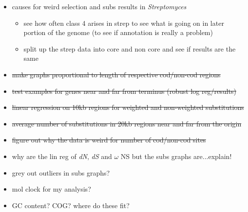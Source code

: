 \documentclass[12pt]{article}
\newcommand{\strep}{\textit{Streptomyces}\xspace}
\newcommand{\dn}{\textit{dN}\xspace}
\newcommand{\ds}{\textit{dS}\xspace}
\begin{document}
\begin{itemize}
	\item causes for weird selection and subs results in \strep
	\begin{itemize}
		\item see how often class 4 arises in strep to see what is going on in later portion of the genome (to see if annotation is really a problem)
		
		\item split up the strep data into core and non core and see if results are the same
	\end{itemize}
	
	\item \sout{make graphs proportional to length of respective cod/non-cod regions}
	
	\item \sout{test examples for genes near and far from terminus (robust log reg/results)}
	
	\item \sout{linear regression on 10kb regions for weighted and non-weighted substitutions}
	
	\item \sout{average number of substitutions in 20kb regions near and far from the origin}
	
	\item \sout{figure out why the data is weird for number of cod/non-cod sites}
	
	\item why are the lin reg of \dn, \ds and $\omega$ NS but the subs graphs are...explain!
	
	\item grey out outliers in subs graphs?
	
	\item mol clock for my analysis?
	
	\item GC content? COG? where do these fit?
	
\end{itemize}
\end{document}
